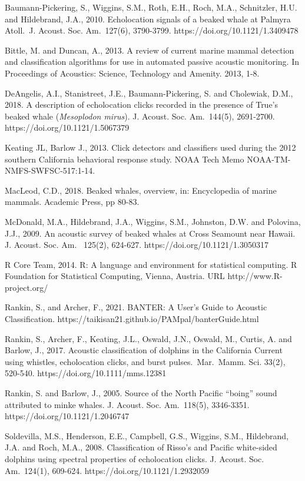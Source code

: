 \documentclass[
  letterpaper,
  DIV=11,
  numbers=noendperiod]{scrartcl}
\begin{document}
Baumann-Pickering, S., Wiggins, S.M., Roth, E.H., Roch, M.A.,
Schnitzler, H.U. and Hildebrand, J.A., 2010. Echolocation signals of a
beaked whale at Palmyra Atoll.~J. Acoust. Soc. Am.~127(6), 3790-3799.
https://doi.org/10.1121/1.3409478

Bittle, M. and Duncan, A., 2013. A review of current marine mammal
detection and classification algorithms for use in automated passive
acoustic monitoring. In Proceedings of Acoustics: Science, Technology
and Amenity. 2013, 1-8.

DeAngelis, A.I., Stanistreet, J.E., Baumann-Pickering, S. and Cholewiak,
D.M., 2018. A description of echolocation clicks recorded in the
presence of True's beaked whale (\emph{Mesoplodon mirus}). J. Acoust.
Soc. Am.~144(5), 2691-2700. https://doi.org/10.1121/1.5067379

Keating JL, Barlow J., 2013. Click detectors and classifiers used during
the 2012 southern California behavioral response study. NOAA Tech Memo
NOAA-TM-NMFS-SWFSC-517:1-14.

MacLeod, C.D., 2018. Beaked whales, overview, in: Encyclopedia of marine
mammals. Academic Press, pp 80-83.

McDonald, M.A., Hildebrand, J.A., Wiggins, S.M., Johnston, D.W. and
Polovina, J.J., 2009. An acoustic survey of beaked whales at Cross
Seamount near Hawaii. J. Acoust. Soc. Am.~ 125(2), 624-627.
https://doi.org/10.1121/1.3050317

R Core Team, 2014. R: A language and environment for statistical
computing. R Foundation for Statistical Computing, Vienna, Austria. URL
http://www.R-project.org/

Rankin, S., and Archer, F., 2021. BANTER: A User's Guide to Acoustic
Classification. https://taikisan21.github.io/PAMpal/banterGuide.html

Rankin, S., Archer, F., Keating, J.L., Oswald, J.N., Oswald, M., Curtis,
A. and Barlow, J., 2017. Acoustic classification of dolphins in the
California Current using whistles, echolocation clicks, and burst
pulses.~Mar.~Mamm. Sci. 33(2), 520-540.
https://doi.org/10.1111/mms.12381

Rankin, S. and Barlow, J., 2005. Source of the North Pacific ``boing''
sound attributed to minke whales. J. Acoust. Soc. Am.~118(5), 3346-3351.
https://doi.org/10.1121/1.2046747

Soldevilla, M.S., Henderson, E.E., Campbell, G.S., Wiggins, S.M.,
Hildebrand, J.A. and Roch, M.A., 2008. Classification of Risso's and
Pacific white-sided dolphins using spectral properties of echolocation
clicks. J. Acoust. Soc. Am.~124(1), 609-624.
https://doi.org/10.1121/1.2932059
\end{document}
